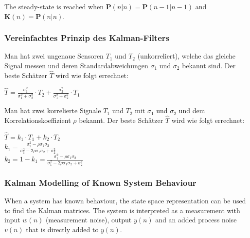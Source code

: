 The steady-state is reached when $\mathbf{P}(n|n) = \mathbf{P}(n-1 | n-1)$ and $\mathbf{K}(n) = \mathbf{P}(n|n)$.

\subsubsection{Vereinfachtes Prinzip des Kalman-Filters}
\begin{minipage}{14.5cm}
Man hat zwei ungenaue Sensoren $T_1$ und $T_2$ (unkorreliert), welche das gleiche Signal messen und deren Standardabweichungen $\sigma_1$ und $\sigma_2$ bekannt sind. Der beste
Schätzer $\hat{T}$ wird wie folgt errechnet:\\
\end{minipage}
\hspace{0.25cm}
\begin{minipage}{5cm}
$\hat{T}=\frac{\sigma_1^2}{\sigma_1^2+\sigma_2^2}\cdot T_2+\frac{\sigma_2^2}{\sigma_1^2+\sigma_2^2}\cdot T_1$
\end{minipage}
\begin{minipage}{14.5cm}
Man hat zwei korrelierte Signale $T_1$ und $T_2$ mit $\sigma_1$ und $\sigma_2$ und dem Korrelationskoeffizient $\rho$ bekannt. Der beste
Schätzer $\hat{T}$ wird wie folgt errechnet:\\
\end{minipage}
\hspace{0.25cm}
\begin{minipage}{5cm}
$\hat{T}=k_1\cdot T_1 + k_2\cdot T_2$\\
$k_1=\frac{\sigma_2^2-\rho \sigma_1 \sigma_2}{\sigma_1^2 - 2 \rho \sigma_1 \sigma_2 + \sigma_2^2}$\\
$k_2=1-k_1=\frac{\sigma_1^2-\rho \sigma_1 \sigma_2}{\sigma_1^2 - 2 \rho \sigma_1 \sigma_2 + \sigma_2^2}$\\
\end{minipage}

\subsubsection{Kalman Modelling of Known System Behaviour}
When a system has known behaviour, the state space representation can be used to find the Kalman matrices. The system is interpreted as a measurement with input $w(n)$ (measurement noise), output $y(n)$ and an added process noise $v(n)$ that is directly added to $y(n)$. 

